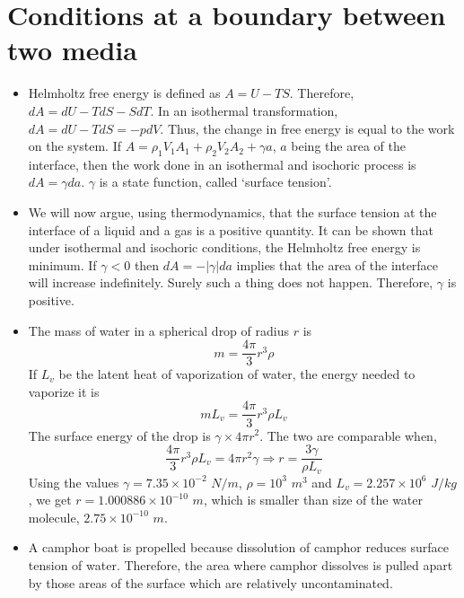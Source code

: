 \section{Conditions at a boundary between two media}
\begin{itemize}
\item Helmholtz free energy is defined as $A = U - TS$. Therefore, $dA = dU - TdS - SdT$. In an isothermal transformation, $dA = dU - TdS = -pdV$. Thus, the change in free energy is equal
to the work on the system. If $A = \rho_1 V_1 A_1 + \rho_2 V_2 A_2 + \gamma a$, $a$ being the area of the interface, then the work done in an isothermal and isochoric process is $dA = 
\gamma da$. $\gamma$ is a state function, called \enquote*{surface tension}.

\item We will now argue, using thermodynamics, that the surface tension at the interface of a liquid and a gas is a positive quantity. It can be shown that\cite{zemansky1996heat} under 
isothermal and isochoric conditions, the Helmholtz free energy is minimum. If $\gamma < 0$ then $dA = -|\gamma|da$ implies that the area of the interface will increase indefinitely. 
Surely such a thing does not happen. Therefore, $\gamma$ is positive.

\item The mass of water in a spherical drop of radius $r$ is 
\[
m = \frac{4\pi}{3}r^3\rho
\]
If $L_v$ be the latent heat of vaporization of water, the energy needed to vaporize it is
\[
mL_v = \frac{4\pi}{3}r^3\rho L_v
\]
The surface energy of the drop is $\gamma \times 4\pi r^2$. The two are comparable when,
\[
\frac{4\pi}{3}r^3\rho L_v = 4\pi r^2 \gamma \Rightarrow r = \frac{3\gamma}{\rho L_v}
\]
Using the values $\gamma = 7.35 \times 10^{-2}$ $N/m$, $\rho = 10^3$ $m^3$ and $L_v = 2.257 \times 10^6$ $J/kg$, we get $r = 1.000886 \times 10^{-10}$ $m$, which is smaller than size of 
the water molecule, $2.75 \times 10^{-10}$ $m$.

\item A camphor boat is propelled because dissolution of camphor reduces surface tension of water. Therefore, the area where camphor dissolves is pulled apart by those areas of the 
surface which are relatively uncontaminated.


\end{itemize}

